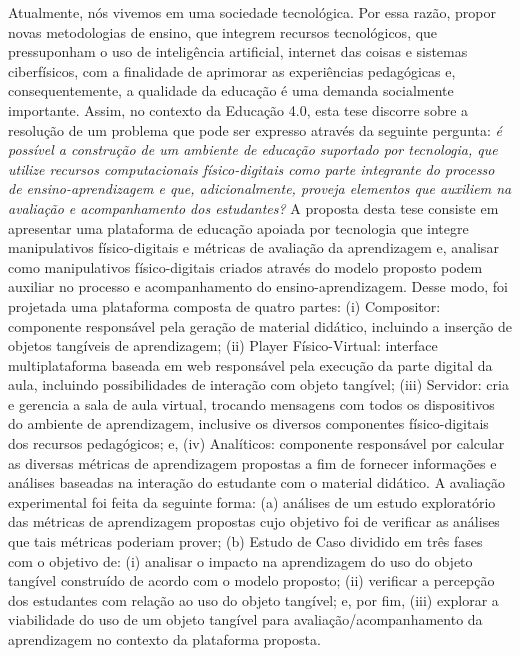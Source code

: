 % 
\begin{resumo}

Atualmente, nós vivemos em uma sociedade tecnológica. Por essa razão, propor novas metodologias de ensino, que integrem recursos tecnológicos, que pressuponham o uso de inteligência artificial, internet das coisas e sistemas ciberfísicos, com a finalidade de aprimorar as experiências pedagógicas e, consequentemente, a qualidade da educação é uma demanda socialmente importante. Assim, no contexto da Educação 4.0, esta tese discorre sobre a resolução de um problema que pode ser expresso através da seguinte pergunta: \textit{é possível a construção de um ambiente de educação suportado por tecnologia, que utilize recursos computacionais físico-digitais como parte integrante do processo de ensino-aprendizagem e que, adicionalmente, proveja elementos que auxiliem na avaliação e acompanhamento dos estudantes?}
A proposta desta tese consiste em apresentar uma plataforma de educação apoiada por tecnologia que integre manipulativos físico-digitais e métricas de avaliação da aprendizagem e, analisar como manipulativos físico-digitais criados através do modelo proposto podem auxiliar no processo e acompanhamento do ensino-aprendizagem.
Desse modo, foi projetada uma plataforma composta de quatro partes: (i) Compositor: componente responsável pela geração de material didático, incluindo a inserção de objetos tangíveis de aprendizagem; (ii) Player Físico-Virtual: interface multiplataforma baseada em web responsável pela execução da parte digital da aula, incluindo possibilidades de interação com objeto tangível; (iii) Servidor: cria e gerencia a sala de aula virtual, trocando mensagens com todos os dispositivos do ambiente de aprendizagem, inclusive os diversos componentes físico-digitais dos recursos pedagógicos; e, (iv) Analíticos: componente responsável por calcular as diversas métricas de aprendizagem propostas a fim de fornecer informações e análises baseadas na interação do estudante com o material didático. 
A avaliação experimental foi feita da seguinte forma: (a) análises de um estudo exploratório das métricas de aprendizagem propostas cujo objetivo foi de verificar as análises que tais métricas poderiam prover; (b) Estudo de Caso dividido em três fases com o objetivo de: (i) analisar o impacto na aprendizagem do uso do objeto tangível construído de acordo com o modelo proposto; (ii) verificar a percepção dos estudantes com relação ao uso do objeto tangível; e, por fim, (iii) explorar a viabilidade do uso de um objeto tangível para avaliação/acompanhamento da aprendizagem no contexto da plataforma proposta. 


\end{resumo}
